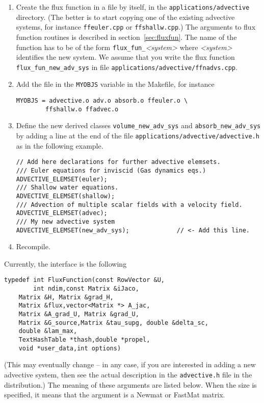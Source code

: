 \begin{enumerate}
\item Create the flux function in a file by
itself, in the \verb+applications/advective+ directory. (The better is
to start copying one of the existing advective systems, for instance
\verb+ffeuler.cpp+ or \verb+ffshallw.cpp+.) The arguments to flux
function routines is described in section~\ref{sec:fluxfun}. 
The name of the
function has to be of the form \verb+flux_fun_+\emph{<system>} where
\emph{<system>} identifies the new system. We assume that you write
the flux function \verb+flux_fun_new_adv_sys+ in file 
\verb+applications/advective/ffnadvs.cpp+. 

\item Add the file in the \verb+MYOBJS+ variable in the Makefile, for
instance

\begin{verbatim} 
MYOBJS = advective.o adv.o absorb.o ffeuler.o \
		ffshallw.o ffadvec.o
\end{verbatim}

\item Define the new derived classes \verb+volume_new_adv_sys+ and
\verb+absorb_new_adv_sys+ by adding a line at the end of the file
\verb+applications/advective/advective.h+ as in the following
example. 

\begin{verbatim} 
// Add here declarations for further advective elemsets. 
/// Euler equations for inviscid (Gas dynamics eqs.)
ADVECTIVE_ELEMSET(euler);    
/// Shallow water equations. 
ADVECTIVE_ELEMSET(shallow);
/// Advection of multiple scalar fields with a velocity field. 
ADVECTIVE_ELEMSET(advec);
/// My new advective system          
ADVECTIVE_ELEMSET(new_adv_sys);             // <- Add this line. 
\end{verbatim}

\item Recompile. 
\end{enumerate}

\label{sec:fluxfun} 

Currently, the interface is the following
%
\begin{verbatim}
typedef int FluxFunction(const RowVector &U,
        int ndim,const Matrix &iJaco, 
	Matrix &H, Matrix &grad_H, 
	Matrix &flux,vector<Matrix *> A_jac, 
	Matrix &A_grad_U, Matrix &grad_U,  
	Matrix &G_source,Matrix &tau_supg, double &delta_sc, 
	double &lam_max, 
	TextHashTable *thash,double *propel, 
	void *user_data,int options)
\end{verbatim}
%
(This may eventually change -- in any case, if you are interested in
adding a new advective system, then see the actual description in the
\verb+advective.h+ file in the distribution.) The meaning of these
arguments are listed below. When the size is specified, it means that
the argument is a Newmat or FastMat matrix. 

